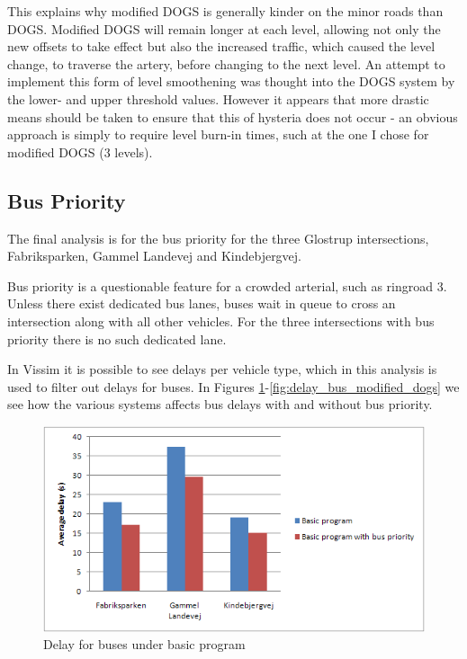 This explains why modified DOGS is generally kinder on the minor roads than DOGS. Modified DOGS will remain longer at each level, allowing not only the new offsets to take effect but also the increased traffic, which caused the level change, to traverse the artery, before changing to the next level. An attempt to implement this form of level smoothening was thought into the DOGS system by the lower- and upper threshold values. However it appears that more drastic means should be taken to ensure that this of hysteria does not occur - an obvious approach is simply to require level burn-in times, such at the one I chose for modified DOGS (3 levels).

\subsection{Bus Priority}
The final analysis is for the bus priority for the three Glostrup intersections, Fabriksparken, Gammel Landevej and Kindebjergvej.

Bus priority is a questionable feature for a crowded arterial, such as ringroad 3. Unless there exist dedicated bus lanes, buses wait in queue to cross an intersection along with all other vehicles. For the three intersections with bus priority there is no such dedicated lane.

In Vissim it is possible to see delays per vehicle type, which in this analysis is used to filter out delays for buses.
In Figures \ref{fig:delay_bus_basic}-\ref{fig:delay_bus_modified_dogs} we see how the various systems affects bus delays with and without bus priority.

\begin{figure}[ht]
\begin{center}
\includegraphics[scale=0.30]{delay_bus_basic.png} 
\end{center}
\caption{Delay for buses under basic program}
\label{fig:delay_bus_basic}
\end{figure}

